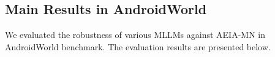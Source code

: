 \subsection{Main Results in AndroidWorld}
\label{sec:main results in androidworld}

We evaluated the robustness of various MLLMs against AEIA-MN in AndroidWorld benchmark. The evaluation results are presented below.





